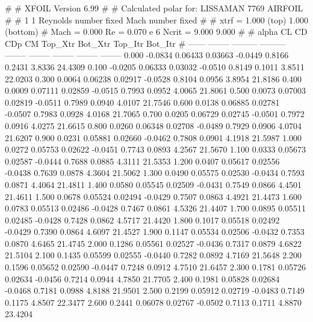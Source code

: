 #  
#       XFOIL         Version 6.99
#  
# Calculated polar for: LISSAMAN 7769 AIRFOIL                           
#  
# 1 1 Reynolds number fixed          Mach number fixed         
#  
# xtrf =   1.000 (top)        1.000 (bottom)  
# Mach =   0.000     Re =     0.070 e 6     Ncrit =   9.000  9.000
#  
#   alpha    CL        CD       CDp       CM     Top_Xtr  Bot_Xtr  Top_Itr  Bot_Itr
#  ------ -------- --------- --------- -------- -------- -------- -------- --------
   0.000  -0.0834   0.06433   0.03663  -0.0449   0.8166   0.2431   3.8336  24.4309
   0.100  -0.0205   0.06333   0.03032  -0.0510   0.8149   0.1011   3.8511  22.0203
   0.300   0.0064   0.06238   0.02917  -0.0528   0.8104   0.0956   3.8954  21.8186
   0.400   0.0009   0.07111   0.02859  -0.0515   0.7993   0.0952   4.0065  21.8061
   0.500   0.0073   0.07003   0.02819  -0.0511   0.7989   0.0940   4.0107  21.7546
   0.600   0.0138   0.06885   0.02781  -0.0507   0.7983   0.0928   4.0168  21.7065
   0.700   0.0205   0.06729   0.02745  -0.0501   0.7972   0.0916   4.0275  21.6615
   0.800   0.0260   0.06348   0.02708  -0.0489   0.7929   0.0906   4.0704  21.6207
   0.900   0.0231   0.05881   0.02660  -0.0462   0.7808   0.0901   4.1918  21.5987
   1.000   0.0272   0.05753   0.02622  -0.0451   0.7743   0.0893   4.2567  21.5670
   1.100   0.0333   0.05673   0.02587  -0.0444   0.7688   0.0885   4.3111  21.5353
   1.200   0.0407   0.05617   0.02556  -0.0438   0.7639   0.0878   4.3604  21.5062
   1.300   0.0490   0.05575   0.02530  -0.0434   0.7593   0.0871   4.4064  21.4811
   1.400   0.0580   0.05545   0.02509  -0.0431   0.7549   0.0866   4.4501  21.4611
   1.500   0.0678   0.05524   0.02494  -0.0429   0.7507   0.0863   4.4921  21.4473
   1.600   0.0783   0.05513   0.02486  -0.0428   0.7467   0.0861   4.5326  21.4407
   1.700   0.0895   0.05511   0.02485  -0.0428   0.7428   0.0862   4.5717  21.4420
   1.800   0.1017   0.05518   0.02492  -0.0429   0.7390   0.0864   4.6097  21.4527
   1.900   0.1147   0.05534   0.02506  -0.0432   0.7353   0.0870   4.6465  21.4745
   2.000   0.1286   0.05561   0.02527  -0.0436   0.7317   0.0879   4.6822  21.5104
   2.100   0.1435   0.05599   0.02555  -0.0440   0.7282   0.0892   4.7169  21.5648
   2.200   0.1596   0.05652   0.02590  -0.0447   0.7248   0.0912   4.7510  21.6457
   2.300   0.1781   0.05726   0.02634  -0.0456   0.7214   0.0944   4.7850  21.7705
   2.400   0.1981   0.05828   0.02684  -0.0468   0.7181   0.0988   4.8188  21.9501
   2.500   0.2199   0.05912   0.02719  -0.0483   0.7149   0.1175   4.8507  22.3477
   2.600   0.2441   0.06078   0.02767  -0.0502   0.7113   0.1711   4.8870  23.4204
